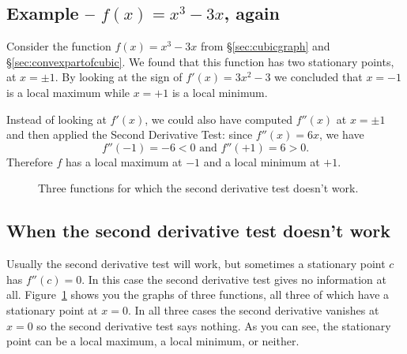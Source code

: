 \subsection{Example -- $f(x) = x^3-3x$, again} %
Consider the function $f(x) = x^3-3x$ from \S\ref{sec:cubicgraph} and
\S\ref{sec:convexpartofcubic}.  We found that this function has two
stationary points, at $x=\pm1$.  By looking at the sign of
$f'(x) = 3x^2-3$ we concluded that $x=-1$ is a local maximum while
$x=+1$ is a local minimum.
  
Instead of looking at $f'(x)$, we could also have computed $f''(x)$ at $x=\pm1$
and then applied the Second Derivative Test: since $f''(x) = 6x$, we have
\[
f''(-1) = -6 < 0 \text{ and }
f''(+1) = 6 > 0.
\]
Therefore $f$ has a local maximum at $-1$ and a local minimum at $+1$.




\begin{figure}[h]
  \centering 
  \caption{Three functions for which the second derivative test
    doesn't work.}
  \label{fig:05nonMorsepoints}
\end{figure}




\subsection{When the second derivative test doesn't work} %
Usually the second derivative test will work, but sometimes a
stationary point $c$ has $f''(c)=0$.  In this case the second
derivative test gives no information at all.
Figure~\ref{fig:05nonMorsepoints} shows you the graphs of three
functions, all three of which have a stationary point at $x=0$.  In
all three cases the second derivative vanishes at $x=0$ so the second
derivative test says nothing.  As you can see, the stationary point
can be a local maximum, a local minimum, or neither.








